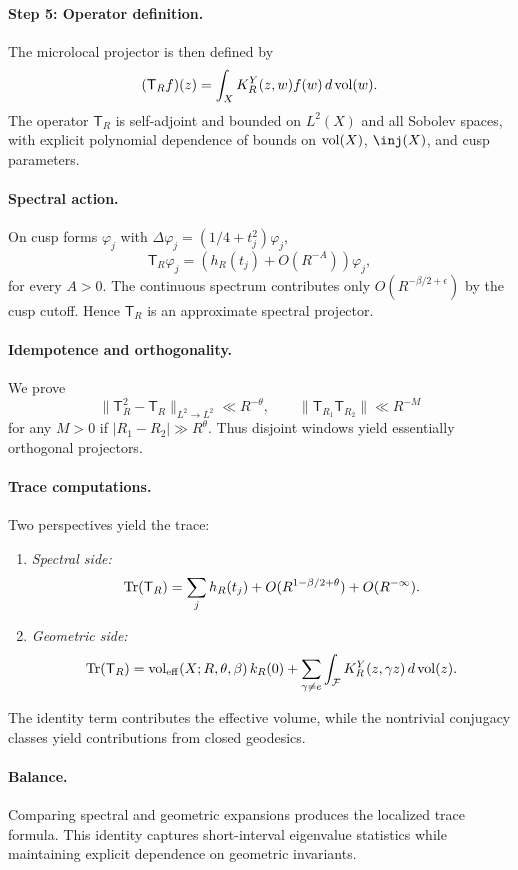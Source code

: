 \paragraph{Step 5: Operator definition.}  
The microlocal projector is then defined by
\[
  (\mathsf{T}_R f)(z) = \int_X K_R^Y(z,w) f(w)\, d\operatorname{vol}(w).
\]
The operator $\mathsf{T}_R$ is self-adjoint and bounded on $L^2(X)$ and all Sobolev
spaces, with explicit polynomial dependence of bounds on $\operatorname{vol}(X)$, $\inj(X)$, and cusp
parameters.

\paragraph{Spectral action.}  
On cusp forms $\varphi_j$ with $\Delta \varphi_j = (1/4+t_j^2)\varphi_j$,
\[
  \mathsf{T}_R \varphi_j = \left(h_R(t_j) + O(R^{-A})\right)\varphi_j,
\]
for every $A>0$. The continuous spectrum contributes only $O(R^{-\beta/2+\epsilon})$ by
the cusp cutoff. Hence $\mathsf{T}_R$ is an approximate spectral projector.

\paragraph{Idempotence and orthogonality.}  
We prove
\[
  \|\mathsf{T}_R^2 - \mathsf{T}_R\|_{L^2\to L^2} \ll R^{-\theta}, \qquad
  \|\mathsf{T}_{R_1}\mathsf{T}_{R_2}\| \ll R^{-M}
\]
for any $M>0$ if $|R_1-R_2|\gg R^\theta$. Thus disjoint windows yield essentially
orthogonal projectors.

\paragraph{Trace computations.}  
Two perspectives yield the trace:
\begin{enumerate}
  \item \textit{Spectral side:}
    \[
      \mathrm{Tr}(\mathsf{T}_R) = \sum_j h_R(t_j) + O(R^{1-\beta/2+\theta}) + O(R^{-\infty}).
    \]
  \item \textit{Geometric side:}
    \[
      \mathrm{Tr}(\mathsf{T}_R) = \operatorname{vol}_{\mathrm{eff}}(X;R,\theta,\beta)\,k_R(0)
        + \sum_{\gamma\neq e} \int_{\mathcal{F}} K_R^Y(z,\gamma z)\, d\operatorname{vol}(z).
    \]
\end{enumerate}
The identity term contributes the effective volume, while the nontrivial conjugacy classes
yield contributions from closed geodesics.

\paragraph{Balance.}  
Comparing spectral and geometric expansions produces the localized trace formula. This
identity captures short-interval eigenvalue statistics while maintaining explicit
dependence on geometric invariants.

